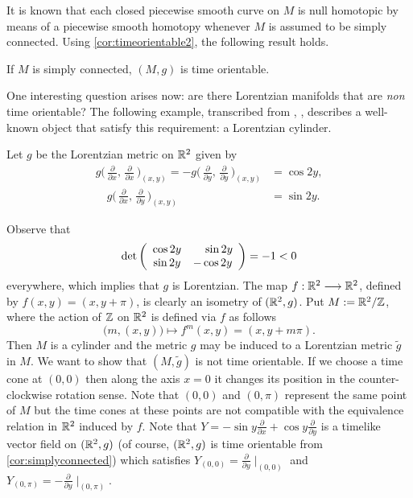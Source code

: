 It is known that each closed piecewise smooth curve on $M$ is null homotopic by means of a piecewise smooth homotopy whenever $M$ is assumed to be simply connected. Using \autoref{cor:timeorientable2}, the following result holds.

\begin{corollary}
	\label{cor:simplyconnected}
	If $M$ is simply connected, $(M,g)$ is time orientable.
\end{corollary}

One interesting question arises now: are there Lorentzian manifolds that are \emph{non} time orientable? The following example, transcribed from \cite[Example 3.5]{romero10}, \cite[Example 1.2.3]{sachs77}, describes a well-known object that satisfy this requirement: a Lorentzian cylinder.

\begin{example}
	Let $g$ be the Lorentzian metric on $\mathbb{R}^2$ given by
	\begin{align*}
	g\Big(\,\frac{\partial}{\partial x},\,\frac{\partial}{\partial x}\,\Big)_{(x,y)}=-g\Big(\,\frac{\partial}{\partial y},\,\frac{\partial}{\partial y}\,\Big)_{(x,y)} &= \cos 2y,\\
	\quad g\Big(\,\frac{\partial}{\partial x},\,\frac{\partial}{\partial y}\,\Big)_{(x,y)}&= \sin 2y.
	\end{align*}
	
	Observe that
	\[
	\mathrm{det}\left(
	\begin{array}{cc}
	\cos 2y & \hspace*{4mm}\sin 2y  \\
	\sin 2y & -\cos 2y
	\end{array} \right) = -1 < 0
	\]
	everywhere, which implies that $g$ is Lorentzian. The map $f : \mathbb{R}^2 \longrightarrow \mathbb{R}^2$, defined by $f(x,y)=(x,y+\pi)$, is clearly an isometry of $(\mathbb{R}^2,g)$. Put $M:=\mathbb{R}^2 / {\mathbb Z}$, where the action of ${\mathbb Z}$ on $\mathbb{R}^2$ is defined via $f$ as follows
	\[
	\big(m,(x,y)\big) \mapsto f^m(x,y)=(x,y+m\pi).
	\]
	Then $M$ is a cylinder and the metric $g$ may be induced to a Lorentzian metric ${\tilde g}$ in $M$. We want to show that $(M,{\tilde g})$ is not time orientable. If we choose a time cone at $(0,0)$ then along the axis $x=0$ it changes its position in the counter-clockwise rotation sense. Note that $(0,0)$ and $(0,\pi)$ represent the same point of $M$ but the time cones at these points are not compatible with the equivalence relation in $\mathbb{R}^2$ induced by $f$. Note that $Y=-\sin y \frac{\partial}{\partial x} + \cos y \frac{\partial}{\partial y}$ is a timelike vector field on $(\mathbb{R}^2,g)$ (of course, $(\mathbb{R}^2,g)$ is time orientable from \autoref{cor:simplyconnected}) which satisfies $Y_{(0,0)}=\frac{\partial}{\partial y}\mid_{(0,0)}$ and $Y_{(0,\pi)}=-\frac{\partial}{\partial y}\mid_{(0,\pi)}$.
	

\end{example}

